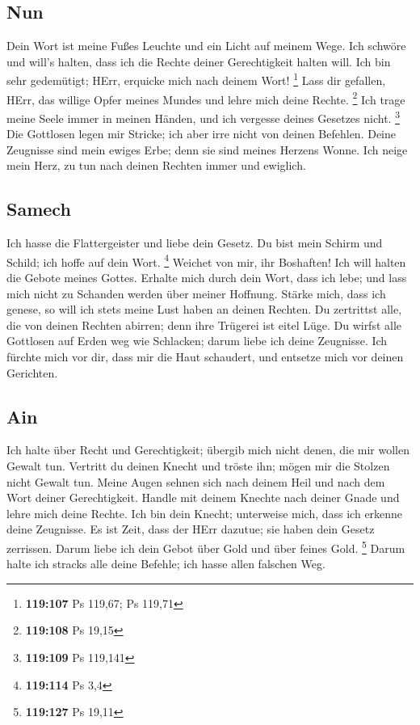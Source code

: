 \hypertarget{nun}{%
\subsection{Nun}\label{nun}}

 Dein Wort ist meine Fußes Leuchte und ein Licht auf
meinem Wege.  Ich schwöre und will's halten, dass ich
die Rechte deiner Gerechtigkeit halten will.  Ich bin
sehr gedemütigt; HErr, erquicke mich nach deinem Wort! \footnote{\textbf{119:107}
  Ps 119,67; Ps 119,71}  Lass dir gefallen, HErr, das
willige Opfer meines Mundes und lehre mich deine Rechte. \footnote{\textbf{119:108}
  Ps 19,15}  Ich trage meine Seele immer in meinen
Händen, und ich vergesse deines Gesetzes nicht. \footnote{\textbf{119:109}
  Ps 119,141}  Die Gottlosen legen mir Stricke; ich aber
irre nicht von deinen Befehlen.  Deine Zeugnisse sind
mein ewiges Erbe; denn sie sind meines Herzens Wonne. 
Ich neige mein Herz, zu tun nach deinen Rechten immer und ewiglich.

\hypertarget{samech}{%
\subsection{Samech}\label{samech}}

 Ich hasse die Flattergeister und liebe dein Gesetz.
 Du bist mein Schirm und Schild; ich hoffe auf dein
Wort. \footnote{\textbf{119:114} Ps 3,4}  Weichet von
mir, ihr Boshaften! Ich will halten die Gebote meines Gottes.
 Erhalte mich durch dein Wort, dass ich lebe; und lass
mich nicht zu Schanden werden über meiner Hoffnung. 
Stärke mich, dass ich genese, so will ich stets meine Lust haben an
deinen Rechten.  Du zertrittst alle, die von deinen
Rechten abirren; denn ihre Trügerei ist eitel Lüge.  Du
wirfst alle Gottlosen auf Erden weg wie Schlacken; darum liebe ich deine
Zeugnisse.  Ich fürchte mich vor dir, dass mir die Haut
schaudert, und entsetze mich vor deinen Gerichten.

\hypertarget{ain}{%
\subsection{Ain}\label{ain}}

 Ich halte über Recht und Gerechtigkeit; übergib mich
nicht denen, die mir wollen Gewalt tun.  Vertritt du
deinen Knecht und tröste ihn; mögen mir die Stolzen nicht Gewalt tun.
 Meine Augen sehnen sich nach deinem Heil und nach dem
Wort deiner Gerechtigkeit.  Handle mit deinem Knechte
nach deiner Gnade und lehre mich deine Rechte.  Ich bin
dein Knecht; unterweise mich, dass ich erkenne deine Zeugnisse.
 Es ist Zeit, dass der HErr dazutue; sie haben dein
Gesetz zerrissen.  Darum liebe ich dein Gebot über Gold
und über feines Gold. \footnote{\textbf{119:127} Ps 19,11}
 Darum halte ich stracks alle deine Befehle; ich hasse
allen falschen Weg.

